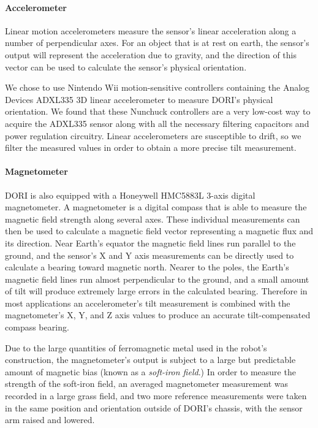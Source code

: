 \documentclass[12pt]{article}
\newcommand{\brand}{}
\begin{document}
    \paragraph*{Accelerometer}
    Linear motion accelerometers measure the sensor's linear acceleration along a number of perpendicular axes. For an object that is at rest on earth, the sensor's output will represent the acceleration due to gravity, and the direction of this vector can be used to calculate the sensor's physical orientation. 

    We chose to use \brand{Nintendo Wii} motion-sensitive controllers containing the \brand{Analog Devices ADXL335} 3D linear accelerometer to measure DORI's physical orientation. We found that these Nunchuck controllers are a very low-cost way to acquire the \brand{ADXL335} sensor along with all the necessary filtering capacitors and power regulation circuitry. Linear accelerometers are susceptible to drift, so we filter the measured values in order to obtain a more precise tilt measurement. 

    \paragraph*{Magnetometer}
    DORI is also equipped with a \brand{Honeywell HMC5883L} 3-axis digital magnetometer. A magnetometer is a digital compass that is able to measure the magnetic field strength along several axes. These individual measurements can then be used to calculate a magnetic field vector representing a magnetic flux and its direction. Near Earth's equator the magnetic field lines run parallel to the ground, and the sensor's X and Y axis measurements can be directly used to calculate a bearing toward magnetic north. Nearer to the poles, the Earth's magnetic field lines run almost perpendicular to the ground, and a small amount of tilt will produce extremely large errors in the calculated bearing. Therefore in most applications an accelerometer's tilt measurement is combined with the magnetometer's X, Y, and Z axis values to produce an accurate tilt-compensated compass bearing.

    Due to the large quantities of ferromagnetic metal used in the robot's construction, the magnetometer's output is subject to a large but predictable amount of magnetic bias (known as a \emph{soft-iron field}.) In order to measure the strength of the soft-iron field, an averaged magnetometer measurement was recorded in a large grass field, and two more reference measurements were taken in the same position and orientation outside of DORI's chassis, with the sensor arm raised and lowered.
    
\end{document}

